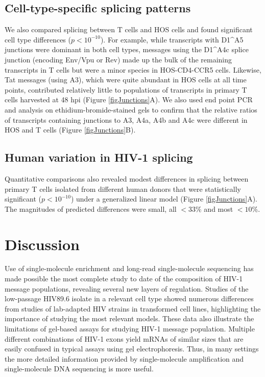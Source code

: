 \documentclass[../sherrill-Mix_thesis.tex]{subfiles}
\begin{document}
\subsection{Cell-type-specific splicing patterns}
We also compared splicing between T cells and HOS cells and found significant cell type differences ($p < 10^{-10}$). For example, while transcripts with D1\^{}A5 junctions were dominant in both cell types, messages using the D1\^{}A4c splice junction (encoding Env/Vpu or Rev) made up the bulk of the remaining transcripts in T cells but were a minor species in HOS-CD4-CCR5 cells. Likewise, Tat messages (using A3), which were quite abundant in HOS cells at all time points, contributed relatively little to populations of transcripts in primary T cells harvested at 48 hpi (Figure \ref{figJunctions}A). We also used end point PCR and analysis on ethidium-bromide-stained gels to confirm that the relative ratios of transcripts containing junctions to A3, A4a, A4b and A4c were different in HOS and T cells (Figure \ref{figJunctions}B).

\subsection{Human variation in HIV-1 splicing}

Quantitative comparisons also revealed modest differences in splicing between primary \cdFour{} T cells isolated from different human donors that were statistically significant ($p < 10^{-10}$) under a generalized linear model (Figure \ref{figJunctions}A). The magnitudes of predicted differences were small, all $<33$\% and most $<10$\%.


\section{Discussion}
Use of single-molecule enrichment and long-read single-molecule sequencing has made possible the most complete study to date of the composition of HIV-1 message populations, revealing several new layers of regulation. Studies of the low-passage HIV89.6 isolate in a relevant cell type showed numerous differences from studies of lab-adapted HIV strains in transformed cell lines, highlighting the importance of studying the most relevant models. These data also illustrate the limitations of gel-based assays for studying HIV-1 message population. Multiple different combinations of HIV-1 exons yield mRNAs of similar sizes that are easily confused in typical assays using gel electrophoresis. Thus, in many settings the more detailed information provided by single-molecule amplification and single-molecule DNA sequencing is more useful.
\end{document}

